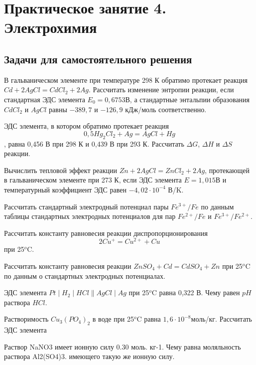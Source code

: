 \chapter{ Практическое занятие 4. Электрохимия}
\section{Задачи для самостоятельного решения}
\begin{Task}
В гальваническом элементе при температуре 298 К обратимо протекает реакция $Cd + 2AgCl = CdCl_{2} + 2Ag$. Рассчитать изменение энтропии реакции, если стандартная ЭДС элемента $E_{0}= 0,6753$В, а стандартные энтальпии образования $CdCl_{2}$ и $AgCl$ равны $-389,7$ и $-126,9$ кДж/моль соответственно. 
\end{Task}
\begin{Task}
ЭДС элемента, в котором обратимо протекает реакция $$0,5Hg_{2}Cl_{2} + Ag = AgCl + Hg$$, равна 0,456 В при 298 К и 0,439 В при 293 К. Рассчитать $\Delta G$,  $\Delta H$ и  $\Delta S$ реакции.
\end{Task}
\begin{Task}
Вычислить тепловой эффект реакции $Zn + 2AgCl = ZnCl_{2} + 2Ag$, протекающей в гальваническом элементе при 273 К, если ЭДС элемента $E=1,015$В и температурный коэффициент ЭДС равен $-4,02\cdot 10^{-4}$ В/K.
\end{Task}
\begin{Task}
Рассчитать стандартный электродный потенциал пары $Fe^{3+}/Fe$ по данным таблицы стандартных электродных потенциалов для пар $Fe^{2+}/Fe$ и $Fe^{3+}/Fe^{2+}$.
\end{Task}
\begin{Task}
Рассчитать константу равновесия реакции диспропорционирования $$2Cu^{+}=Cu^{2+}+Cu$$ при 25$^{o}$C.
\end{Task}
\begin{Task}
Рассчитать константу равновесия реакции $ZnSO_{4} + Cd = CdSO_{4} + Zn$ при 25$^{o}$C по данным о стандартных электродных потенциалах.
\end{Task}
\begin{Task}
ЭДС элемента $Pt\mid H_{2}\mid HCl \parallel AgCl \mid Ag$ при 25$^{o}$C равна 0,322 В. Чему равен $pH$ раствора $HCl$.
\end{Task}
\begin{Task}
Растворимость $Cu_{3}(PO_{4})_{2}$ в воде при 25$^{o}$C равна $1,6\cdot 10^{-8}$моль/кг. Рассчитать ЭДС элемента 
\end{Task}
\begin{Task}
Раствор NaNO3 имеет ионную силу 0.30 моль. кг-1. Чему равна моляльность раствора Al2(SO4)3. имеющего такую же ионную силу.
\end{Task}
